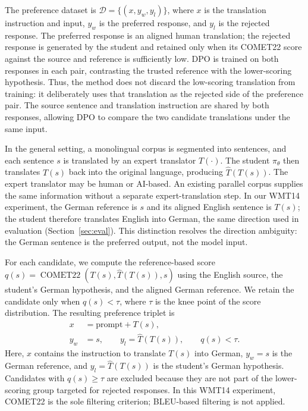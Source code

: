 \documentclass[conference]{IEEEtran}
\begin{document}
The preference dataset is $\mathcal{D}=\{(x,y_w,y_l)\}$, where $x$ is the translation instruction and input, $y_w$ is the preferred response, and $y_l$ is the rejected response. The preferred response is an aligned human translation; the rejected response is generated by the student and retained only when its COMET22 score against the source and reference is sufficiently low. DPO is trained on both responses in each pair, contrasting the trusted reference with the lower-scoring hypothesis. Thus, the method does not discard the low-scoring translation from training: it deliberately uses that translation as the rejected side of the preference pair. The source sentence and translation instruction are shared by both responses, allowing DPO to compare the two candidate translations under the same input.

In the general setting, a monolingual corpus is segmented into sentences, and each sentence $s$ is translated by an expert translator $T(\cdot)$. The student $\pi_\theta$ then translates $T(s)$ back into the original language, producing $\hat{T}(T(s))$. The expert translator may be human or AI-based. An existing parallel corpus supplies the same information without a separate expert-translation step. In our WMT14 experiment, the German reference is $s$ and its aligned English sentence is $T(s)$; the student therefore translates English into German, the same direction used in evaluation (Section~\ref{sec:eval}). This distinction resolves the direction ambiguity: the German sentence is the preferred output, not the model input.

For each candidate, we compute the reference-based score $q(s)=\operatorname{COMET22}(T(s),\hat{T}(T(s)),s)$ using the English source, the student's German hypothesis, and the aligned German reference. We retain the candidate only when $q(s)<\tau$, where $\tau$ is the knee point of the score distribution. The resulting preference triplet is
\[
\begin{aligned}
x &= \text{prompt} + T(s),\\
y_w &= s, \qquad y_l = \hat{T}(T(s)), \qquad q(s)<\tau.
\end{aligned}
\]
Here, $x$ contains the instruction to translate $T(s)$ into German, $y_w=s$ is the German reference, and $y_l=\hat{T}(T(s))$ is the student's German hypothesis. Candidates with $q(s)\geq\tau$ are excluded because they are not part of the lower-scoring group targeted for rejected responses. In this WMT14 experiment, COMET22 is the sole filtering criterion; BLEU-based filtering is not applied.
\end{document}
